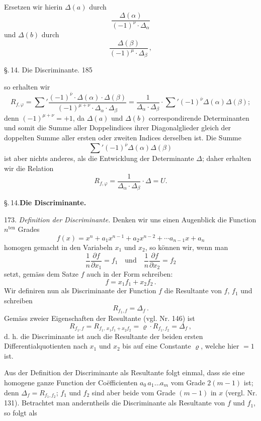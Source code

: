 \documentclass[11pt]{article}
\providecommand{\gesperrt}[1]{\textls[130]{#1}}
\providecommand{\weberpage}[1]{}
\let\Delta\varDelta
\let\rho\varrho
\begin{document}
Ersetzen wir hierin $\Delta(a)$ durch
\[
\dfrac{\Delta(\alpha)}{(-1)^\nu\cdot\Delta_\alpha}
\]
und $\Delta(b)$ durch
\[
\dfrac{\Delta(\beta)}{(-1)^\mu\cdot\Delta_\beta}\,,
\]


\weberpage{185}
\S.\,14. Die Discriminante. 185

so erhalten wir
\[
R_{f,\varphi} = \sum{}'\dfrac{(-1)^{\bar\nu}\cdot\Delta(\alpha)\cdot\Delta(\beta)}{(-1)^{\mu+\nu}\cdot\Delta_\alpha\cdot\Delta_\beta}
= \dfrac{1}{\Delta_\alpha\cdot\Delta_\beta}\cdot\sum{}'(-1)^{\bar\nu}\Delta(\alpha)\Delta(\beta);
\]
denn $(-1)^{\mu+\nu}=+1$, da $\Delta(a)$ und $\Delta(b)$ correspondirende Determinanten und somit die Summe aller Doppelindices ihrer Diagonalglieder gleich der doppelten Summe aller ersten oder zweiten Indices derselben ist. Die Summe
\[
\sum{}'(-1)^{\bar\nu}\Delta(\alpha)\Delta(\beta)
\]
ist aber nichts anderes, als die \gesperrt{Laplace'sche} Entwicklung der
Determinante $\Delta$; daher erhalten wir die Relation
\[
R_{f,\varphi} = \dfrac{1}{\Delta_\alpha\cdot\Delta_\beta}\cdot\Delta = U.
\]

\begin{center}
\S.\,14.\quad\textbf{Die Discriminante.}
\end{center}

173. \textit{Definition der Discriminante.} Denken wir uns einen Augenblick die Function $n^{\text{ten}}$ Grades
\[
f(x) = x^n + a_1x^{n-1} + a_2x^{n-2} + \cdots a_{n-1}x + a_n
\]
homogen gemacht in den Variabeln $x_1$ und $x_2$, so können wir, wenn man
\[
\frac{1}{n}\frac{\partial f}{\partial x_1} = f_1 \quad\text{und}\quad \frac{1}{n}\frac{\partial f}{\partial x_2} = f_2
\]
setzt, gemäss dem \gesperrt{Euler'schen} Satze $f$ auch in der Form
schreiben:
\[
f = x_1f_1 + x_2f_2\,.
\]
Wir definiren nun als Discriminante der Function $f$ die Resultante
von $f$, $f_1$ und schreiben
\[
R_{f_1,f} = \Delta_f\,.
\]
Gemäss zweier Eigenschaften der Resultante (vgl. Nr. 146) ist
\[
R_{f_1,f} = R_{f_1,\,x_1f_1+x_2f_2} = \rho\cdot R_{f_1,f_2} = \Delta_f\,,
\]
d. h. die Discriminante ist auch die Resultante der beiden ersten Differentialquotienten nach $x_1$ und $x_2$ bis auf eine Constante $\rho$, welche
hier $= 1$ ist.

Aus der Definition der Discriminante als Resultante folgt einmal,
dass sie eine homogene ganze Function der Co\"efficienten $a_0\,a_1\ldots a_m$
vom Grade $2(m-1)$ ist; denn $\Delta_f = R_{f_1,f_2}$; $f_1$ und $f_2$ sind aber beide
vom Grade $(m-1)$ in $x$ (vergl. Nr. 131). Betrachtet man anderntheils
die Discriminante als Resultante von $f$ und $f_1$, so folgt als
\end{document}
